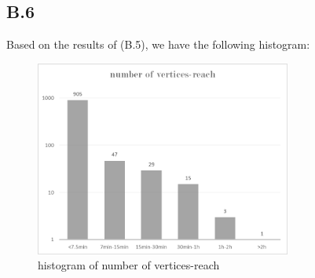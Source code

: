 \documentclass[titlepage,11pt,a4paper]{article}
\begin{document}
\subsection{B.6}
Based on the results of (B.5), we have the following histogram:

\begin{figure}[h]
    \centering
    \includegraphics[width =0.75\textwidth]{reach.png}
    \caption{histogram of number of vertices-reach}
    \label{fig:reach}
\end{figure}
\end{document}
